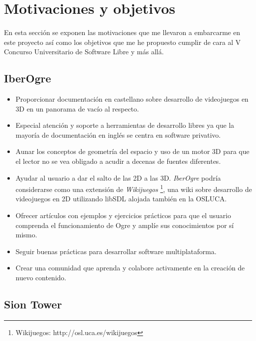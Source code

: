 \documentclass[16pt,spanish]{article}
\def \wiki{\emph{IberOgre} }
\begin{document}
\section{Motivaciones y objetivos}

\paragraph{}
En esta sección se exponen las motivaciones que me llevaron a embarcarme
en este proyecto así como los objetivos que me he propuesto cumplir de cara
al V Concurso Universitario de Software Libre y más allá.

\subsection{IberOgre}

\begin{itemize}
    \item Proporcionar documentación en castellano sobre desarrollo de
    videojuegos en 3D en un panorama de vacío al respecto.
    \item Especial atención y soporte a herramientas de desarrollo libres
    ya que la mayoría de documentación en inglés se centra en software privativo.
    \item Aunar los conceptos de geometría del espacio y uso de un motor 3D
    para que el lector no se vea obligado a acudir a decenas de fuentes
    diferentes.
    \item Ayudar al usuario a dar el salto de las 2D a las 3D. \wiki podría
    considerarse como una extensión de \emph{Wikijuegos}
    \footnote{Wikijuegos: http://osl.uca.es/wikijuegos}, una wiki
    sobre desarrollo de videojuegos en 2D utilizando libSDL alojada también
    en la OSLUCA.
    \item Ofrecer artículos con ejemplos y ejercicios prácticos para que el usuario
    comprenda el funcionamiento de Ogre y amplíe sus conocimientos por sí
    mismo.
    \item Seguir buenas prácticas para desarrollar software multiplataforma.
    \item Crear una comunidad que aprenda y colabore activamente en la creación
    de nuevo contenido.
\end{itemize}

\subsection{Sion Tower}
\end{document}
